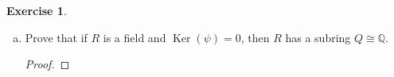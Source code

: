 \documentclass{article}
\newcommand{\bbq}{\mathbb{Q}}
\renewcommand{\ker}{\operatorname{Ker}}
\theoremstyle{plain}
\theoremstyle{definition}
\newtheorem{exer}[lem]{Exercise}
\begin{document}
\begin{exer}
\begin{enumerate}[(a)]
\begin{proof}
    \end{proof}

\item Prove that if $R$ is a field and $\ker(\psi)=0$, then $R$ has a subring $Q\cong\bbq$.
    \begin{proof}
    \end{proof}
\end{enumerate}
\end{exer}

\newpage 
\end{document}
